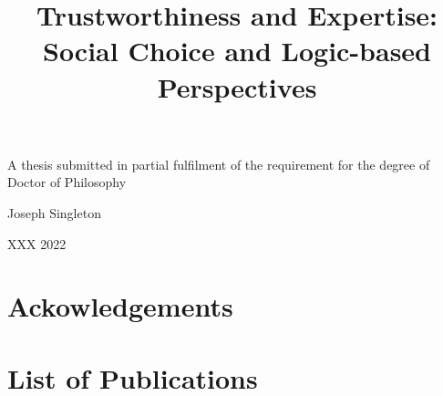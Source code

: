\documentclass[a4paper,11pt,oneside]{memoir}
\title{
    Trustworthiness and Expertise: Social Choice and Logic-based Perspectives
}
\begin{document}
\begin{titlingpage}

    \begin{center}
        {\HUGE\bfseries \thetitle}
        \par
        \vspace{2cm}
        {\Large A thesis submitted in partial fulfilment of the requirement for the
        degree of Doctor of Philosophy}
        \par
        \vspace{2cm}
        {\LARGE Joseph Singleton}
        \par
        \vspace{10cm}
        {\Large XXX 2022}
    \end{center}

    \clearpage

    \begin{abstract}
        
    \end{abstract}

\end{titlingpage}

\frontmatter
\tableofcontents

\clearpage

\chapter*{Ackowledgements}


\chapter*{List of Publications}


\mainmatter

\printbibliography
\appendix

\end{document}
